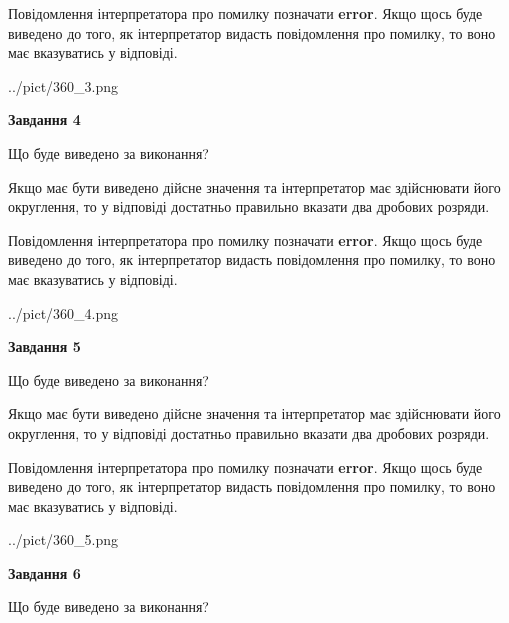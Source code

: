 \documentclass[12pt, ukrainian]{article}
\begin{document}
{\begin {Large}
Повідомлення інтерпретатора про помилку позначати \textbf{error}.
Якщо щось буде виведено до того, як інтерпретатор видасть повідомлення про помилку, 
то воно має вказуватись у відповіді. \par

\begin{center}
	{../pict/360_3.png}
\end{center}
\newpage

{\begin {center}\textbf{Завдання 4}\end {center}}\par
Що буде виведено за виконання? \par

Якщо має бути виведено дійсне значення та інтерпретатор має здійснювати його округлення, 
то у відповіді достатньо правильно вказати два дробових розряди.

Повідомлення інтерпретатора про помилку позначати \textbf{error}.
Якщо щось буде виведено до того, як інтерпретатор видасть повідомлення про помилку, 
то воно має вказуватись у відповіді. \par

\begin{center}
	{../pict/360_4.png}
\end{center}
\newpage

{\begin {center}\textbf{Завдання 5}\end {center}}\par
Що буде виведено за виконання? \par

Якщо має бути виведено дійсне значення та інтерпретатор має здійснювати його округлення, 
то у відповіді достатньо правильно вказати два дробових розряди.

Повідомлення інтерпретатора про помилку позначати \textbf{error}.
Якщо щось буде виведено до того, як інтерпретатор видасть повідомлення про помилку, 
то воно має вказуватись у відповіді. \par

\begin{center}
	{../pict/360_5.png}
\end{center}
\newpage

{\begin {center}\textbf{Завдання 6}\end {center}}\par
Що буде виведено за виконання? \par


\end{Large}}
\end{document}
